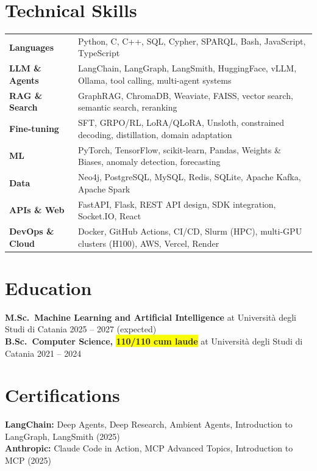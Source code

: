 \documentclass[10pt,a4paper]{article}
\newcommand{\kpi}[1]{{\setlength{\fboxsep}{1.2pt}\colorbox{mark}{\textbf{#1}}}}
\begin{document}
\section{Technical Skills}
\renewcommand{\arraystretch}{1.22}
\begin{tabularx}{\textwidth}{@{} >{\bfseries}l @{\hspace{10pt}} X @{}}
Languages        & Python, C, C++, SQL, Cypher, SPARQL, Bash, JavaScript, TypeScript \\
LLM \& Agents    & LangChain, LangGraph, LangSmith, HuggingFace, vLLM, Ollama, tool calling, multi-agent systems \\
RAG \& Search    & GraphRAG, ChromaDB, Weaviate, FAISS, vector search, semantic search, reranking \\
Fine-tuning      & SFT, GRPO/RL, LoRA/QLoRA, Unsloth, constrained decoding, distillation, domain adaptation \\
ML               & PyTorch, TensorFlow, scikit-learn, Pandas, Weights \& Biases, anomaly detection, forecasting \\
Data             & Neo4j, PostgreSQL, MySQL, Redis, SQLite, Apache Kafka, Apache Spark \\
APIs \& Web      & FastAPI, Flask, REST API design, SDK integration, Socket.IO, React \\
DevOps \& Cloud  & Docker, GitHub Actions, CI/CD, Slurm (HPC), multi-GPU clusters (H100), AWS, Vercel, Render \\
\end{tabularx}
\renewcommand{\arraystretch}{1.0}

\section{Education}

\textbf{M.Sc.\ Machine Learning and Artificial Intelligence} {\color{muted}at Universit\`{a} degli Studi di Catania} \hfill {\color{muted}2025 -- 2027 (expected)} \\[3pt]
\textbf{B.Sc.\ Computer Science, \kpi{110/110 cum laude}} {\color{muted}at Universit\`{a} degli Studi di Catania} \hfill {\color{muted}2021 -- 2024}

\section{Certifications}
\textbf{LangChain:} Deep Agents, Deep Research, Ambient Agents, Introduction to LangGraph, LangSmith (2025) \\[2pt]
\textbf{Anthropic:} Claude Code in Action, MCP Advanced Topics, Introduction to MCP (2025)
\end{document}
